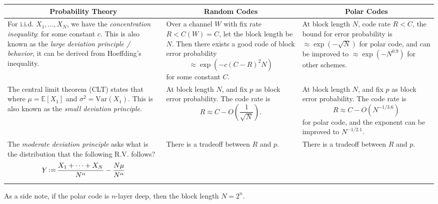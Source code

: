 \begin{table}[H]
    \centering
    \begin{tabularx}{\textwidth}{X|X|X}
        \multicolumn{1}{c}{Probability Theory} & \multicolumn{1}{|c|}{Random Codes} & \multicolumn{1}{c}{Polar Codes} \\ \hline\hline
        For i.i.d. $X_1,\ldots,X_N$, we have the \textit{concentration inequality}:
        \resizebox{\linewidth}{!}{
        $\begin{aligned}
            \mathrm{Pr}\left\{\frac{X_1+\cdots+X_N}{N} -\mathbb{E}[X_1] \ge t\right\} \\ \le \exp(-ct^2N)
        \end{aligned}$
        }
        for some constant $c$. This is also known as the \textit{large deviation principle / behavior}, it can be derived from Hoeffding's inequality. &
        Over a channel $W$ with fix rate $R<C(W)=C$, let the block length be $N$. Then there exists a good code of block error probability
        \begin{equation*}
            \approx \exp(-c(C-R)^2N)
        \end{equation*}
        for some constant $C$. &
        At block length $N$, code rate $R<C$, the bound for error probability is $\approx\exp(-\sqrt{N})$ for polar code, and can be improved to $\approx\exp(-N^{0.9})$ for other schemes.\\ \hline
        The central limit theorem (CLT) states that
        \resizebox{\linewidth}{!}{
        $\begin{aligned}
            Z \defeq \frac{X_1+\cdots+X_N}{\sqrt{N}} - \sqrt{N}\mu \\ \sim \mathcal{N}(0,\sigma^2),
        \end{aligned}$
        }
        where $\mu=\mathbb{E}[X_1]$ and $\sigma^2=\mathrm{Var}(X_1)$. This is also known as the \textit{small deviation principle}. & 
        At block length $N$, and fix $p$ as block error probability. The code rate is
        \begin{equation*}
            R \approx C- O\left(\frac{1}{\sqrt{N}}\right).
        \end{equation*} &
        At block length $N$, and fix $p$ as block error probability. The code rate is
        \begin{equation*}
            R\approx C-O(N^{-1/3.6})
        \end{equation*}
        for polar code, and the exponent can be improved to $N^{-1/2.1}$. \\ \hline
        The \textit{moderate deviation principle} asks what is the distribution that the following R.V. follows?
        \begin{equation*}
            Y \operatorname{\vcentcolon=} \frac{X_1+\cdots+X_N}{N^\alpha}-\frac{N\mu}{N^\alpha}
        \end{equation*} &
        There is a tradeoff between $R$ and $p$. &
        There is a tradeoff between $R$ and $p$.
    \end{tabularx}
\end{table}
As a side note, if the polar code is $n$-layer deep, then the block length $N=2^n$.

